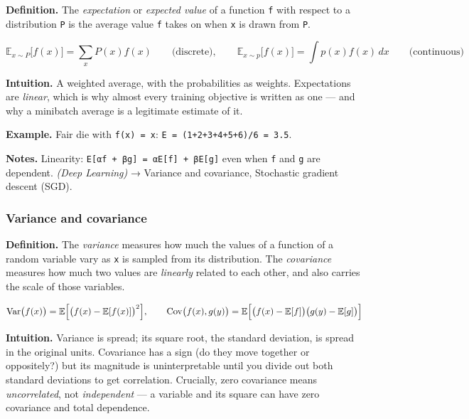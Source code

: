 \documentclass[
  10pt,
  letterpaper,
  onecolumn]{article}
\begin{document}
\textbf{Definition.} The \emph{expectation} or \emph{expected value} of
a function \texttt{f} with respect to a distribution \texttt{P} is the
average value \texttt{f} takes on when \texttt{x} is drawn from
\texttt{P}.

\begin{equation*}
\mathbb{E}_{x\sim P}\bigl[f(x)\bigr]=\sum_x P(x)f(x)
\qquad\text{(discrete)},
\qquad
\mathbb{E}_{x\sim p}\bigl[f(x)\bigr]=\int p(x)f(x)\,dx
\qquad\text{(continuous)}
\end{equation*}

\textbf{Intuition.} A weighted average, with the probabilities as
weights. Expectations are \emph{linear}, which is why almost every
training objective is written as one --- and why a minibatch average is
a legitimate estimate of it.

\textbf{Example.} Fair die with \texttt{f(x)\ =\ x}:
\texttt{E\ =\ (1+2+3+4+5+6)/6\ =\ 3.5}.

\textbf{Notes.} Linearity: \texttt{E{[}αf\ +\ βg{]}\ =\ αE{[}f{]}\ +\ βE{[}g{]}}
even when \texttt{f} and \texttt{g} are dependent. \emph{(Deep
Learning)} → Variance and covariance, Stochastic gradient descent (SGD).

\hypertarget{variance-and-covariance}{%
\subsubsection{Variance and
covariance}\label{variance-and-covariance}}

\textbf{Definition.} The \emph{variance} measures how much the values of
a function of a random variable vary as \texttt{x} is sampled from its
distribution. The \emph{covariance} measures how much two values are
\emph{linearly} related to each other, and also carries the scale of
those variables.

\begin{equation*}
\operatorname{Var}\bigl(f(x)\bigr)=\mathbb{E}\Bigl[\bigl(f(x)-\mathbb{E}[f(x)]\bigr)^{2}\Bigr],
\qquad
\operatorname{Cov}\bigl(f(x),g(y)\bigr)=\mathbb{E}\Bigl[\bigl(f(x)-\mathbb{E}[f]\bigr)\bigl(g(y)-\mathbb{E}[g]\bigr)\Bigr]
\end{equation*}

\textbf{Intuition.} Variance is spread; its square root, the standard
deviation, is spread in the original units. Covariance has a sign
(do they move together or oppositely?) but its magnitude is
uninterpretable until you divide out both standard deviations to get
correlation. Crucially, zero covariance means \emph{uncorrelated}, not
\emph{independent} --- a variable and its square can have zero
covariance and total dependence.
\end{document}
